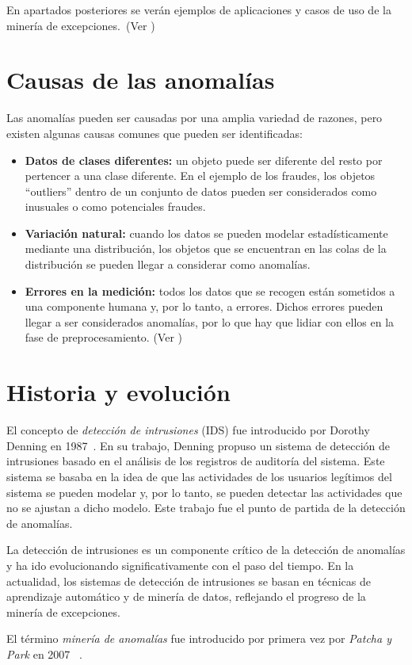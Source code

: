 En apartados posteriores se verán ejemplos de aplicaciones y casos de uso de la minería de
excepciones.~(Ver )

\section{Causas de las anomalías}
Las anomalías pueden ser causadas por una amplia variedad de razones, pero existen algunas
causas comunes que pueden ser identificadas:

\begin{itemize}
	\item \textbf{Datos de clases diferentes:} un objeto puede ser diferente del resto por
		pertencer a una clase diferente. En el ejemplo de los fraudes, los objetos ``outliers''
		dentro de un conjunto de datos pueden ser considerados como inusuales o como potenciales
		fraudes.
	\item \textbf{Variación natural:} cuando los datos se pueden modelar estadísticamente
		mediante una distribución, los objetos que se encuentran en las colas de la distribución
		se pueden llegar a considerar como anomalías.
	\item \textbf{Errores en la medición:} todos los datos que se recogen están sometidos a una
		componente humana y, por lo tanto, a errores. Dichos errores pueden llegar a ser
		considerados anomalías, por lo que hay que lidiar con ellos en la fase de preprocesamiento.
		(Ver )
\end{itemize}

\section{Historia y evolución}\label{sec:hist}
El concepto de \textit{detección de intrusiones} (IDS) fue introducido por Dorothy Denning en
1987~\cite{denning1987intrusion}. En su trabajo, Denning propuso un sistema de detección de intrusiones
basado en el análisis de los registros de auditoría del sistema. Este sistema se basaba en la idea
de que las actividades de los usuarios legítimos del sistema se pueden modelar y, por lo tanto,
se pueden detectar las actividades que no se ajustan a dicho modelo. Este trabajo fue el punto de
partida de la detección de anomalías.

La detección de intrusiones es un componente crítico de la detección de anomalías y ha ido evolucionando
significativamente con el paso del tiempo. En la actualidad, los sistemas de detección de intrusiones
se basan en técnicas de aprendizaje automático y de minería de datos, reflejando el progreso de la minería
de excepciones.

El término \textit{minería de anomalías} fue introducido por primera vez por \textit{Patcha y Park} en 2007
~\cite{patcha2007overview}.
